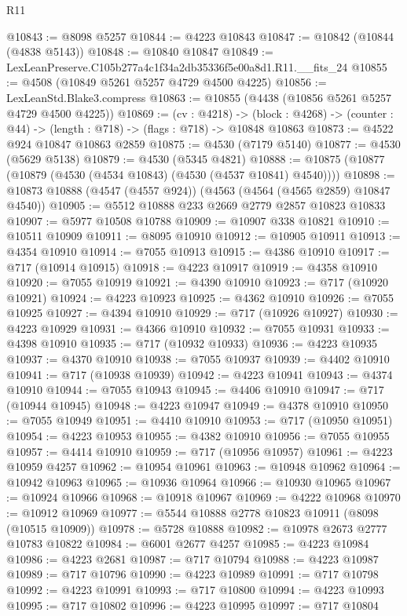 \begin{lexlean}{R11}
\begin{coremodule}
@10843 := @8098 @5257
@10844 := @4223 @10843
@10847 := @10842 (@10844 (@4838 @5143))
@10848 := @10840 @10847
@10849 := LexLeanPreserve.C105b277a4c1f34a2db35336f5e00a8d1.R11.__fits_24
@10855 := @4508 (@10849 @5261 @5257 @4729 @4500 @4225)
@10856 := LexLeanStd.Blake3.compress
@10863 := @10855 (@4438 (@10856 @5261 @5257 @4729 @4500 @4225))
@10869 := (cv : @4218) ->
  (block : @4268) -> (counter : @44) -> (length : @718) -> (flags : @718) -> @10848 @10863
@10873 := @4522 @924 @10847 @10863 @2859
@10875 := @4530 (@7179 @5140)
@10877 := @4530 (@5629 @5138)
@10879 := @4530 (@5345 @4821)
@10888 := @10875 (@10877 (@10879 (@4530 (@4534 @10843) (@4530 (@4537 @10841) @4540))))
@10898 := @10873 @10888 (@4547 (@4557 @924)) (@4563 (@4564 (@4565 @2859) @10847 @4540))
@10905 := @5512 @10888 @233 @2669 @2779 @2857 @10823 @10833
@10907 := @5977 @10508 @10788
@10909 := @10907 @338 @10821
@10910 := @10511 @10909
@10911 := @8095 @10910
@10912 := @10905 @10911
@10913 := @4354 @10910
@10914 := @7055 @10913
@10915 := @4386 @10910
@10917 := @717 (@10914 @10915)
@10918 := @4223 @10917
@10919 := @4358 @10910
@10920 := @7055 @10919
@10921 := @4390 @10910
@10923 := @717 (@10920 @10921)
@10924 := @4223 @10923
@10925 := @4362 @10910
@10926 := @7055 @10925
@10927 := @4394 @10910
@10929 := @717 (@10926 @10927)
@10930 := @4223 @10929
@10931 := @4366 @10910
@10932 := @7055 @10931
@10933 := @4398 @10910
@10935 := @717 (@10932 @10933)
@10936 := @4223 @10935
@10937 := @4370 @10910
@10938 := @7055 @10937
@10939 := @4402 @10910
@10941 := @717 (@10938 @10939)
@10942 := @4223 @10941
@10943 := @4374 @10910
@10944 := @7055 @10943
@10945 := @4406 @10910
@10947 := @717 (@10944 @10945)
@10948 := @4223 @10947
@10949 := @4378 @10910
@10950 := @7055 @10949
@10951 := @4410 @10910
@10953 := @717 (@10950 @10951)
@10954 := @4223 @10953
@10955 := @4382 @10910
@10956 := @7055 @10955
@10957 := @4414 @10910
@10959 := @717 (@10956 @10957)
@10961 := @4223 @10959 @4257
@10962 := @10954 @10961
@10963 := @10948 @10962
@10964 := @10942 @10963
@10965 := @10936 @10964
@10966 := @10930 @10965
@10967 := @10924 @10966
@10968 := @10918 @10967
@10969 := @4222 @10968
@10970 := @10912 @10969
@10977 := @5544 @10888 @2778 @10823 @10911 (@8098 (@10515 @10909))
@10978 := @5728 @10888
@10982 := @10978 @2673 @2777 @10783 @10822
@10984 := @6001 @2677 @4257
@10985 := @4223 @10984
@10986 := @4223 @2681
@10987 := @717 @10794
@10988 := @4223 @10987
@10989 := @717 @10796
@10990 := @4223 @10989
@10991 := @717 @10798
@10992 := @4223 @10991
@10993 := @717 @10800
@10994 := @4223 @10993
@10995 := @717 @10802
@10996 := @4223 @10995
@10997 := @717 @10804

\end{coremodule}
\end{lexlean}
